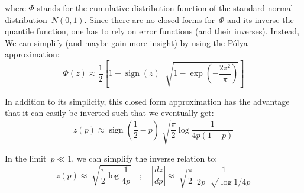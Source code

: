 \documentclass{article}
\DeclareMathOperator{\sign}{sign}
\begin{document}
\noindent where $\Phi$ stands for the cumulative distribution function of the standard normal distribution~$N(0, 1)$.  Since there are no closed forms for~$\Phi$ and its inverse the quantile function, one has to rely on error functions (and their inverses).  Instead, We can simplify (and maybe gain more insight) by using the P\'{o}lya approximation:
\begin{equation}
\Phi(z) \approx \frac{1}{2} \left[ 1 + \sign(z) \, \, \sqrt[]{1 - \exp \left( - \frac{2 z^2}{\pi} \right)} \right]
\end{equation}

\noindent In addition to its simplicity, this closed form approximation has the advantage that it can easily be inverted such that we eventually get:
\begin{equation}
z(p) \approx \sign \left( \frac{1}{2} - p \right) \sqrt[]{\frac{\pi}{2} \log \frac{1}{4 p (1 - p) }}
\end{equation}

\noindent In the limit~$p \ll 1$, we can simplify the inverse relation to:
\begin{equation}
z(p) \approx \sqrt[]{\frac{\pi}{2} \log \frac{1}{4p}} \quad ; \quad \left| \frac{dz}{dp} \right| \approx \sqrt[]{\frac{\pi}{2}} \,\, \frac{1}{2 p \, \, \sqrt[]{\log 1 / 4p}}
\end{equation}
\end{document}
